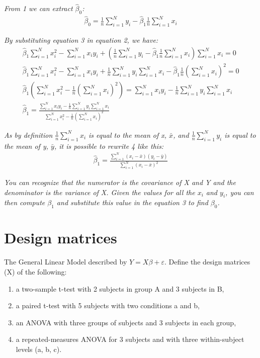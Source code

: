 \documentclass[a4paper,10pt]{article}
\begin{document}
\textit{From 1 we can extract $\hat{\beta}_{0}$:}
\begin{eqnarray}
  \hat{\beta}_{0} = \frac{1}{n}\sum_{i=1}^{N}  y_{i} - \hat{\beta}_{1} \frac{1}{n} \sum_{i=1}^{N}  x_{i}
\end{eqnarray}

\textit{By substituting equation 3 in equation 2, we have:}
\begin{eqnarray}
  \hat{\beta}_{1} \sum_{i=1}^{N} x_{i}^2 - \sum_{i=1}^{N}  x_{i} y_{i} + (\frac{1}{n}\sum_{i=1}^{N}  y_{i} - \hat{\beta}_{1} \frac{1}{n} \sum_{i=1}^{N}  x_{i})\sum_{i=1}^{N}  x_{i} = 0 \nonumber
  \\ \hat{\beta}_{1} \sum_{i=1}^{N} x_{i}^2 - \sum_{i=1}^{N}  x_{i} y_{i} + \frac{1}{n}\sum_{i=1}^{N}  y_{i} \sum_{i=1}^{N}x_{i} - \hat{\beta}_{1} \frac{1}{n} (\sum_{i=1}^{N}  x_{i})^2 = 0 \nonumber
  \\ \hat{\beta}_{1} ( \sum_{i=1}^{N} x_{i}^2 -  \frac{1}{n} (\sum_{i=1}^{N}  x_{i})^2 ) = \sum_{i=1}^{N}  x_{i} y_{i} - \frac{1}{n}\sum_{i=1}^{N}  y_{i} \sum_{i=1}^{N} x_{i} \nonumber
  \\ \hat{\beta}_{1} = \frac{\sum_{i=1}^{N}  x_{i} y_{i} - \frac{1}{n}\sum_{i=1}^{N}  y_{i} \sum_{i=1}^{N} x_{i}} {\sum_{i=1}^{N} x_{i}^2 -  \frac{1}{n} (\sum_{i=1}^{N}  x_{i})^2}
\end{eqnarray}

\textit{As by definition $\frac{1}{n}\sum_{i=1}^{N}  x_{i}$ is equal to the mean of x, $\bar{x}$, and $\frac{1}{n}\sum_{i=1}^{N}  y_{i}$ is equal to the mean of y, $\bar{y}$, it is possible to rewrite 4 like this:}
\begin{eqnarray}
  \hat{\beta}_{1} = \frac{\sum_{i=1}^{N}  (x_{i}-\bar{x}) (y_{i}-\bar{y})} {\sum_{i=1}^{N} (x_{i}-\bar{x})^2}
\end{eqnarray}

\textit{You can recognize that the numerator is the covariance of X and Y and the denominator is the variance of X. Given the values for all the $x_{i}$ and $y_{i}$, you can then compute $\beta_{1}$ and substitute this value in the equation 3 to find $\beta_{0}$.}



\section{Design matrices}

The General Linear Model described by $Y=X\beta+\varepsilon$. Define the design matrices (X) of the following:
\begin{enumerate}
  \item a two-sample t-test with 2 subjects in group A and 3 subjects in B,
  \item a paired t-test with 5 subjects with two conditions a and b,
  \item an ANOVA with three groups of subjects and 3 subjects in each group,
  \item a repeated-measures ANOVA for 3 subjects and with three within-subject levels (a, b, c).
\end{enumerate}
\end{document}
